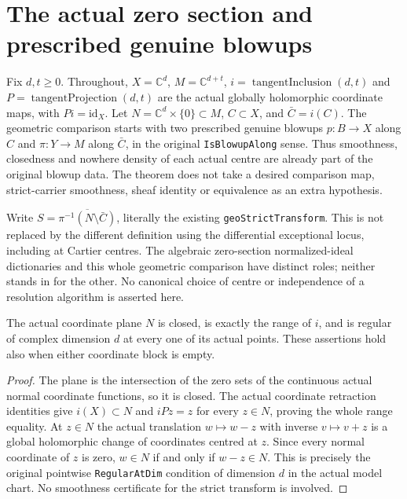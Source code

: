 \chapter{The actual zero section and prescribed genuine blowups}

Fix $d,t\geq0$. Throughout, $X=\mathbb C^d$, $M=\mathbb C^{d+t}$,
$i=\operatorname{tangentInclusion}(d,t)$ and
$P=\operatorname{tangentProjection}(d,t)$ are the actual globally
holomorphic coordinate maps, with $Pi=\mathrm{id}_X$. Let
$N=\mathbb C^d\times\{0\}\subset M$, $C\subset X$, and $\bar C=i(C)$.
The geometric comparison starts with two prescribed genuine blowups
$p:B\to X$ along $C$ and $\pi:Y\to M$ along $\bar C$, in the original
\texttt{IsBlowupAlong} sense. Thus smoothness, closedness and nowhere
density of each actual centre are already part of the original blowup
data. The theorem does not take a desired comparison map, strict-carrier
smoothness, sheaf identity or equivalence as an extra hypothesis.

Write $S=\overline{\pi^{-1}(N\setminus\bar C)}$, literally the existing
\texttt{geoStrictTransform}. This is not replaced by the different
definition using the differential exceptional locus, including at Cartier
centres. The algebraic zero-section normalized-ideal dictionaries and this
whole geometric comparison have distinct roles; neither stands in for the
other. No canonical choice of centre or independence of a resolution
algorithm is asserted here.

\begin{lemma}
\label{hir:actual-zero-section-whole-carrier-regular}
\leanok
The actual coordinate plane $N$ is closed, is exactly the range of $i$,
and is regular of complex dimension $d$ at every one of its actual points.
These assertions hold also when either coordinate block is empty.
\end{lemma}
\begin{proof}
The plane is the intersection of the zero sets of the continuous actual
normal coordinate functions, so it is closed. The actual coordinate
retraction identities give $i(X)\subset N$ and $iPz=z$ for every
$z\in N$, proving the whole range equality. At $z\in N$ the actual
translation $w\mapsto w-z$ with inverse $v\mapsto v+z$ is a global
holomorphic change of coordinates centred at $z$. Since every normal
coordinate of $z$ is zero, $w\in N$ if and only if $w-z\in N$.
This is precisely the original pointwise \texttt{RegularAtDim} condition
of dimension $d$ in the actual model chart. No smoothness certificate for
the strict transform is involved.
\end{proof}

